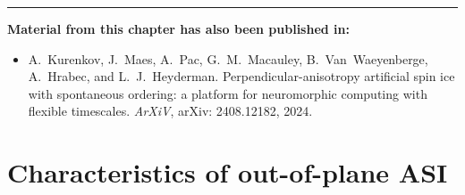\begin{adjustwidth}{2em}{2em} %
	\vspace{0em}
	\begin{center}
		\centering\rule{0.7\linewidth}{0.4pt}
	\end{center}
	\vspace{0em}
	\begin{center}
		\textbf{Material from this chapter has also been published in:} \\
	\end{center}
	\vspace{0em} %
	\begin{adjustwidth}{0em}{1.5em}
		\begin{itemize}
			\item[\cite{KUR-24}] A.~Kurenkov, J.~Maes, A.~Pac, G.~M.~Macauley, B.~Van~Waeyenberge, A.~Hrabec, and L.~J.~Heyderman.
			\newblock Perpendicular-anisotropy artificial spin ice with spontaneous ordering: a platform for neuromorphic computing with flexible timescales.
			\newblock \emph{ArXiV}, arXiv: 2408.12182, 2024.
		\end{itemize}
	\end{adjustwidth}
\end{adjustwidth}

\section{Characteristics of out-of-plane ASI}
